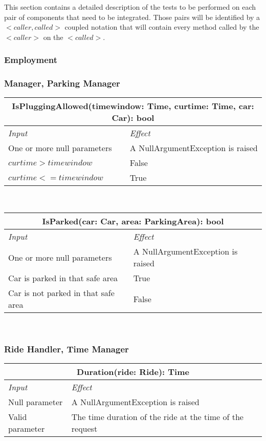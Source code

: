 	This section contains a detailed description of the tests to be performed on each pair of components that need to be integrated. Those pairs will be identified by a $< caller, called >$ coupled notation that will contain every method called by the $< caller >$ on the $< called >$. 

	\subsubsection{Employment}
			
		\subsubsection*{Manager, Parking Manager}
		
			\begin{tabular}{ |l|l| }
				\hline
				\multicolumn{2}{|c|}{IsPluggingAllowed(timewindow: Time, curtime: Time, car: Car): bool}\\
				\hline
				\textit{Input} & \textit{Effect}\\ \hline
				One or more null parameters & A NullArgumentException is raised\\ \hline
				$curtime > timewindow$ & False\\ \hline
				$curtime <= timewindow$ & True\\ \hline
			\end{tabular}
			\\
			\begin{tabular}{ |l|l| }
				\hline
				\multicolumn{2}{|c|}{IsParked(car: Car, area: ParkingArea): bool}\\
				\hline
				\textit{Input} & \textit{Effect}\\ \hline
				One or more null parameters & A NullArgumentException is raised\\ \hline
				Car is parked in that safe area & True\\ \hline
				Car is not parked in that safe area & False\\ \hline
			\end{tabular}
			\\			
		
		
		
		\subsubsection*{Ride Handler, Time Manager}
			\begin{tabular}{ |l|l| }
				\hline
				\multicolumn{2}{|c|}{Duration(ride: Ride): Time}\\
				\hline
				\textit{Input} & \textit{Effect}\\ \hline
				Null parameter & A NullArgumentException is raised\\ \hline
				Valid parameter & The time duration of the ride at the time of the request\\ \hline
			\end{tabular}
			\\
		

